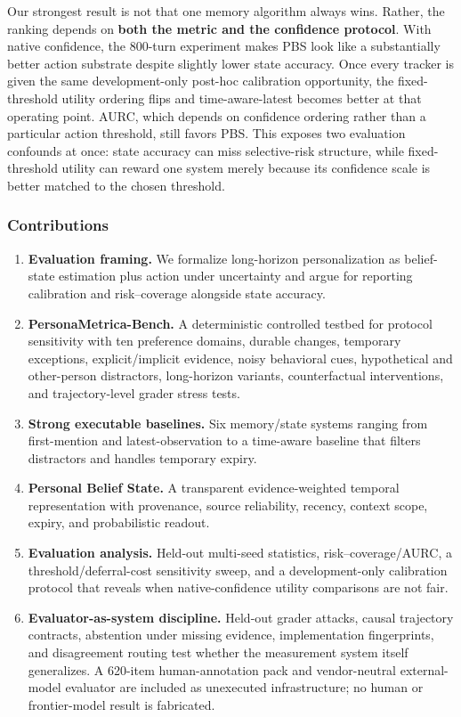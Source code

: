 \documentclass[
  10pt,
  letterpaper,
]{article}
\providecommand{\tightlist}{%
  \setlength{\itemsep}{0pt}\setlength{\parskip}{0pt}}
\begin{document}
Our strongest result is not that one memory algorithm always wins.
Rather, the ranking depends on \textbf{both the metric and the
confidence protocol}. With native confidence, the 800-turn experiment
makes PBS look like a substantially better action substrate despite
slightly lower state accuracy. Once every tracker is given the same
development-only post-hoc calibration opportunity, the fixed-threshold
utility ordering flips and time-aware-latest becomes better at that
operating point. AURC, which depends on confidence ordering rather than
a particular action threshold, still favors PBS. This exposes two
evaluation confounds at once: state accuracy can miss selective-risk
structure, while fixed-threshold utility can reward one system merely
because its confidence scale is better matched to the chosen threshold.

\subsubsection{Contributions}\label{contributions}

\begin{enumerate}
\def\labelenumi{\arabic{enumi}.}
\tightlist
\item
  \textbf{Evaluation framing.} We formalize long-horizon personalization
  as belief-state estimation plus action under uncertainty and argue for
  reporting calibration and risk--coverage alongside state accuracy.
\item
  \textbf{PersonaMetrica-Bench.} A deterministic controlled testbed for
  protocol sensitivity with ten preference domains, durable changes,
  temporary exceptions, explicit/implicit evidence, noisy behavioral
  cues, hypothetical and other-person distractors, long-horizon
  variants, counterfactual interventions, and trajectory-level grader
  stress tests.
\item
  \textbf{Strong executable baselines.} Six memory/state systems ranging
  from first-mention and latest-observation to a time-aware baseline
  that filters distractors and handles temporary expiry.
\item
  \textbf{Personal Belief State.} A transparent evidence-weighted
  temporal representation with provenance, source reliability, recency,
  context scope, expiry, and probabilistic readout.
\item
  \textbf{Evaluation analysis.} Held-out multi-seed statistics,
  risk--coverage/AURC, a threshold/deferral-cost sensitivity sweep, and
  a development-only calibration protocol that reveals when
  native-confidence utility comparisons are not fair.
\item
  \textbf{Evaluator-as-system discipline.} Held-out grader attacks,
  causal trajectory contracts, abstention under missing evidence,
  implementation fingerprints, and disagreement routing test whether the
  measurement system itself generalizes. A 620-item human-annotation
  pack and vendor-neutral external-model evaluator are included as
  unexecuted infrastructure; no human or frontier-model result is
  fabricated.
\end{enumerate}
\end{document}
